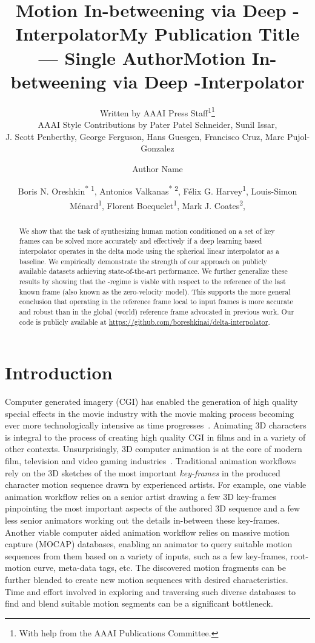 \documentclass[letterpaper]{article} \usepackage[]{aaai23}  \usepackage{times}  \usepackage{helvet}  \usepackage{courier}  \usepackage[hyphens]{url}  \usepackage{graphicx} \urlstyle{rm} \def\UrlFont{\rm}  \usepackage{natbib}  \usepackage{caption} \frenchspacing  \setlength{\pdfpagewidth}{8.5in} \setlength{\pdfpageheight}{11in}
\title{Motion In-betweening via Deep -Interpolator}
\author{
Written by AAAI Press Staff\textsuperscript{\rm 1}\thanks{With help from the AAAI Publications Committee.}\\
    AAAI Style Contributions by Pater Patel Schneider,
    Sunil Issar,\\
    J. Scott Penberthy,
    George Ferguson,
    Hans Guesgen,
    Francisco Cruz\equalcontrib,
    Marc Pujol-Gonzalez\equalcontrib
}
\title{My Publication Title --- Single Author}
\author {
    Author Name
}
\title{Motion In-betweening via Deep -Interpolator}
\author {
Boris N. Oreshkin\textsuperscript{* \rm 1},
    Antonios Valkanas\textsuperscript{* \rm 2}, 
    Félix G. Harvey\textsuperscript{\rm 1}, 
    Louis-Simon Ménard\textsuperscript{\rm 1}, 
    Florent Bocquelet\textsuperscript{\rm 1}, 
    Mark J. Coates\textsuperscript{\rm 2}, 
}
\begin{document}
\maketitle
\begin{abstract}
We show that the task of synthesizing human motion conditioned on a set of key frames can be solved more accurately and effectively if a deep learning based interpolator operates in the delta mode using the spherical linear interpolator as a baseline. We empirically demonstrate the strength of our approach on publicly available datasets achieving state-of-the-art performance. We further generalize these results by showing that the -regime is viable with respect to the reference of the last known frame (also known as the zero-velocity model). This supports the more general conclusion that operating in the reference frame local to input frames is more accurate and robust than in the global (world) reference frame advocated in previous work. Our code is publicly available at
\url{https://github.com/boreshkinai/delta-interpolator}.
\end{abstract}

\section{Introduction}


Computer generated imagery (CGI) has enabled the generation of high quality special effects in the movie industry with the movie making process becoming ever more technologically intensive as time progresses~\citep{ji2010production}. Animating 3D characters is integral to the process of creating high quality CGI in films and in a variety of other contexts. Unsurprisingly, 3D computer animation is at the core of modern film, television and video gaming industries~\cite{beane20123d}. Traditional animation workflows rely on the 3D sketches of the most important \emph{key-frames} in the produced character motion sequence drawn by experienced artists. For example, one viable animation workflow relies on a senior artist drawing a few 3D key-frames pinpointing the most important aspects of the authored 3D sequence and a few less senior animators working out the details in-between these key-frames. Another viable computer aided animation workflow relies on massive motion capture (MOCAP) databases, enabling an animator to query suitable motion sequences from them based on a variety of inputs, such as a few key-frames, root-motion curve, meta-data tags, etc. The discovered motion fragments can be further blended to create new motion sequences with desired characteristics. Time and effort involved in exploring and traversing such diverse databases to find and blend suitable motion segments can be a significant bottleneck.
\end{document}
